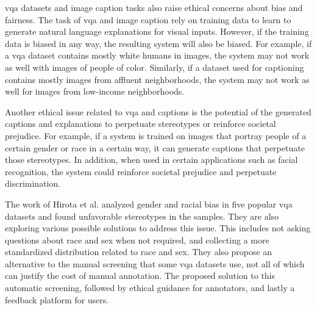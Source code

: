 \begin{comment}
Another ethical issue with \gls{xai} is the possibility that the system will be used for surveillance or other privacy-intrusive purposes. For example, an \gls{xai} system used to monitor people in public spaces could raise concerns about civil liberties and privacy rights. In addition, \gls{xai} systems capable of understanding and interpreting visual or textual information could also be used to profile individuals based on their race, gender, age, or other personal characteristics.
\end{comment}


\gls{vqa} datasets and image caption tasks also raise ethical concerns about bias and fairness. The task of \gls{vqa} and image caption rely on training data to learn to generate natural language explanations for visual inputs. However, if the training data is biased in any way, the resulting system will also be biased. For example, if a \gls{vqa} dataset contains mostly white humans in images, the system may not work as well with images of people of color. Similarly, if a dataset used for captioning contains mostly images from affluent neighborhoods, the system may not work as well for images from low-income neighborhoods. 

Another ethical issue related to \gls{vqa} and captions is the potential of the generated captions and explanations to perpetuate stereotypes or reinforce societal prejudice. For example, if a system is trained on images that portray people of a certain gender or race in a certain way, it can generate captions that perpetuate those stereotypes. In addition, when used in certain applications such as facial recognition, the system could reinforce societal prejudice and perpetuate discrimination.

The work of Hirota et al. \cite{hirotaGenderRacialBias2022} analyzed gender and racial bias in five popular \gls{vqa} datasets and found unfavorable stereotypes in the samples. They are also exploring various possible solutions to address this issue. This includes not asking questions about race and sex when not required, and collecting a more standardized distribution related to race and sex. They also propose an alternative to the manual screening that some \gls{vqa} datasets use, not all of which can justify the cost of manual annotation. The proposed solution to this automatic screening, followed by ethical guidance for annotators, and lastly a feedback platform for users. 



